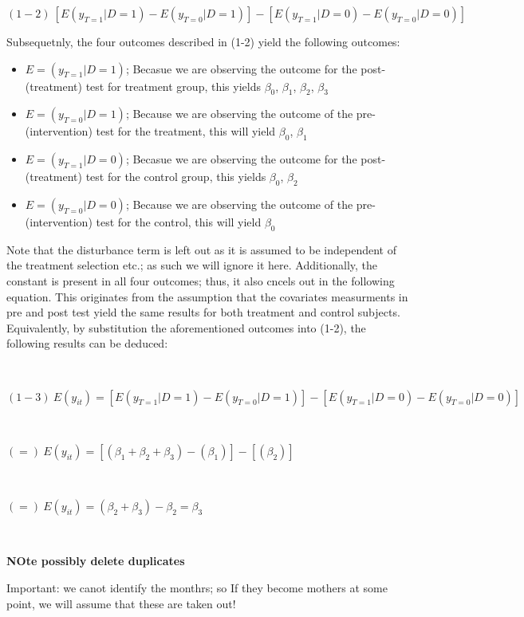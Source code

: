 \documentclass[a4paper]{article}
\begin{document}
$
(1-2) \ [E(y_{T=1} | D=1) - E(y_{T=0} | D=1)] - [E(y_{T=1} | D=0) - E(y_{T=0} | D=0)]
$


Subsequetnly, the four outcomes described in (1-2) yield the following outcomes:

\begin{itemize}
\item $E = (y_{T=1} | D=1)$; Becasue we are observing the outcome for the post-(treatment) test for treatment group, this yields $\beta_{0}$, $\beta_{1}$, $\beta_{2}$, $\beta_{3}$ 
\item $E = (y_{T=0} | D=1)$; Because we are observing the outcome of the pre-(intervention) test for the treatment, this will yield $\beta_{0}$, $\beta_{1}$
\item $E = (y_{T=1} | D=0)$; Becasue we are observing the outcome for the post-(treatment) test for the control group, this yields $\beta_{0}$, $\beta_{2}$ 
\item $E = (y_{T=0} | D=0)$; Because we are observing the outcome of the pre-(intervention) test for the control, this will yield $\beta_{0}$
\end{itemize}

Note that the disturbance term is left out as it is assumed to be independent of the treatment selection etc.; as such we will ignore it here. 
Additionally, the constant is present in all four outcomes; thus, it also cncels out in the following equation. This originates from the assumption that the covariates measurments in pre and post test yield the same results for both treatment and control subjects. Equivalently, by substitution the aforementioned outcomes into (1-2), the following results can be deduced:

\

$
(1-3) \ E(y_{it}) =  [E(y_{T=1} | D=1) - E(y_{T=0} | D=1)] - [E(y_{T=1} | D=0) - E(y_{T=0} | D=0)]
$

\

$
(=) \ E(y_{it}) = [(\beta_{1} + \beta_{2} + \beta_{3}) - (\beta_{1})] - [(\beta_{2})]
$

\

$
(=) \ E(y_{it}) = (\beta_{2} + \beta_{3}) - \beta_{2} = \beta_{3}
$

\



\textbf{NOte possibly delete duplicates}



Important: we canot identify the monthrs; so If they become mothers at some point, we will assume that these are taken out!
\end{document}
